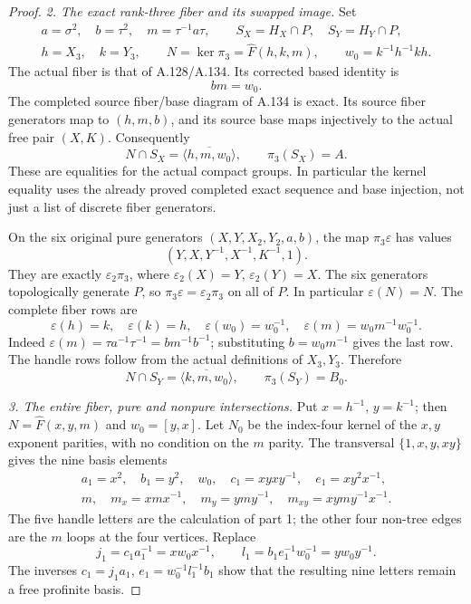 \begin{proof}
\par\smallskip\noindent
\emph{2. The exact rank-three fiber and its swapped image.}
Set
\[
\begin{gathered}
 a=\sigma^2,\quad b=\tau^2,\quad m=\tau^{-1}a\tau,\qquad
 S_X=H_X\cap P,\quad S_Y=H_Y\cap P,\\
 h=X_3,\quad k=Y_3,\qquad
 N=\ker\pi_3=\widehat F(h,k,m),\qquad
 w_0=k^{-1}h^{-1}kh .
\end{gathered}
\tag{A.138.9}
\]
The actual fiber is that of A.128/A.134. Its corrected based
identity is
\[
                              bm=w_0 .
\tag{A.138.10}
\]
The completed source fiber/base diagram of A.134 is exact.
Its source fiber generators map to \((h,m,b)\), and its
source base maps injectively to the actual free pair \((X,K)\).
Consequently
\[
 N\cap S_X=\overline{\langle h,m,w_0\rangle},\qquad
 \pi_3(S_X)=A .
\tag{A.138.11}
\]
These are equalities for the actual compact groups. In
particular the kernel equality uses the already proved
completed exact sequence and base injection, not just a list
of discrete fiber generators.

On the six original pure generators \((X,Y,X_2,Y_2,a,b)\),
the map \(\pi_3\varepsilon\) has values
\[
                 (Y,X,Y^{-1},X^{-1},K^{-1},1).
\tag{A.138.12}
\]
They are exactly \(\varepsilon_2\pi_3\), where
\(\varepsilon_2(X)=Y\), \(\varepsilon_2(Y)=X\).
The six generators topologically generate \(P\), so
\(\pi_3\varepsilon=\varepsilon_2\pi_3\) on all of \(P\).
In particular \(\varepsilon(N)=N\).
The complete fiber rows are
\[
 \varepsilon(h)=k,\quad \varepsilon(k)=h,\quad
 \varepsilon(w_0)=w_0^{-1},\quad
 \varepsilon(m)=w_0m^{-1}w_0^{-1}.
\tag{A.138.13}
\]
Indeed \(\varepsilon(m)=\tau a^{-1}\tau^{-1}
=bm^{-1}b^{-1}\); substituting \(b=w_0m^{-1}\)
gives the last row. The handle rows follow from the actual
definitions of \(X_3,Y_3\). Therefore
\[
 N\cap S_Y=\overline{\langle k,m,w_0\rangle},\qquad
 \pi_3(S_Y)=B_0 .
\tag{A.138.14}
\]

\par\smallskip\noindent
\emph{3. The entire fiber, pure and nonpure intersections.}
Put \(x=h^{-1}\), \(y=k^{-1}\); then
\(N=\widehat F(x,y,m)\) and \(w_0=[y,x]\).
Let \(N_0\) be the index-four kernel of the \(x,y\)
exponent parities, with no condition on the \(m\) parity.
The transversal \(\{1,x,y,xy\}\) gives the nine basis elements
\[
\begin{gathered}
 a_1=x^2,\quad b_1=y^2,\quad w_0,\quad
 c_1=xyxy^{-1},\quad e_1=xy^2x^{-1},\\
 m,\quad m_x=xmx^{-1},\quad m_y=ymy^{-1},\quad
 m_{xy}=xymy^{-1}x^{-1}.
\end{gathered}
\tag{A.138.15}
\]
The five handle letters are the calculation of part 1; the
other four non-tree edges are the \(m\) loops at the four
vertices. Replace
\[
 j_1=c_1a_1^{-1}=xw_0x^{-1},\qquad
 l_1=b_1e_1^{-1}w_0^{-1}=yw_0y^{-1}.
\]
The inverses \(c_1=j_1a_1\),
\(e_1=w_0^{-1}l_1^{-1}b_1\) show that the resulting
nine letters remain a free profinite basis.


\end{proof}
